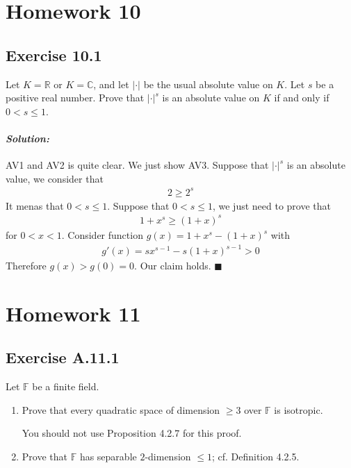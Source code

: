 \documentclass[12pt, a4paper]{article}
\newenvironment{solution}
  {\paragraph{\textit{Solution:}}\par\medskip}
  {\hfill$\blacksquare$\vspace{0.1cm}}
\begin{document}
\section*{Homework 10}

\subsection*{Exercise 10.1}
Let $K = \mathbb{R}$ or $K = \mathbb{C}$, and let $|\cdot|$ be the usual absolute value on $K$. Let $s$ be a positive real number. Prove that $|\cdot|^s$ is an absolute value on $K$ if and only if $0 < s \leq 1$.

\begin{solution}
    AV1 and AV2 is quite clear. We just show AV3.
    Suppose that $|\cdot|^s$ is an absolute value, we consider that 
    \begin{align*}
        2\ge 2^s
    \end{align*}
    It menas that $0<s\le 1$. Suppose that $0<s\le 1$, we just need to prove that 
    \begin{align*}
        1+x^s\ge (1+x)^s
    \end{align*}
    for $0<x< 1$. Consider function $g(x)=1+x^s-(1+x)^s$ with 
    \begin{align*}
        g'(x) = sx^{s-1} - s(1+x)^{s-1}>0
    \end{align*}
    Therefore $g(x)>g(0)=0$. Our claim holds.
\end{solution}

\section*{Homework 11}

\subsection*{Exercise A.11.1}

Let $\mathbb{F}$ be a finite field.

\begin{enumerate}
    \item Prove that every quadratic space of dimension $\geq 3$ over $\mathbb{F}$ is isotropic.

    You should not use Proposition 4.2.7 for this proof.

    \item Prove that $\mathbb{F}$ has separable $2$-dimension $\leq 1$; cf. Definition 4.2.5.
\end{enumerate}
\end{document}
